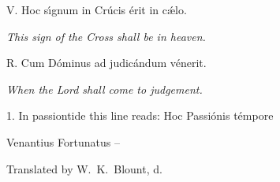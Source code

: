 \endlyrics

\medskip

\s V. Hoc s\'\i gnum in Cr\'ucis \'erit in c\'\ae lo.

{\hskip20mm \it This sign of the Cross shall be in heaven.}

\s R. Cum D\'ominus ad judic\'andum v\'enerit.

{\hskip20mm \it When the Lord shall come to judgement.}

\bigskip

1. In passiontide this line reads: Hoc Passi\'onis t\'empore

\source Venantius Fortunatus {}--

\source Translated by W.~K.~Blount, d.~{}




